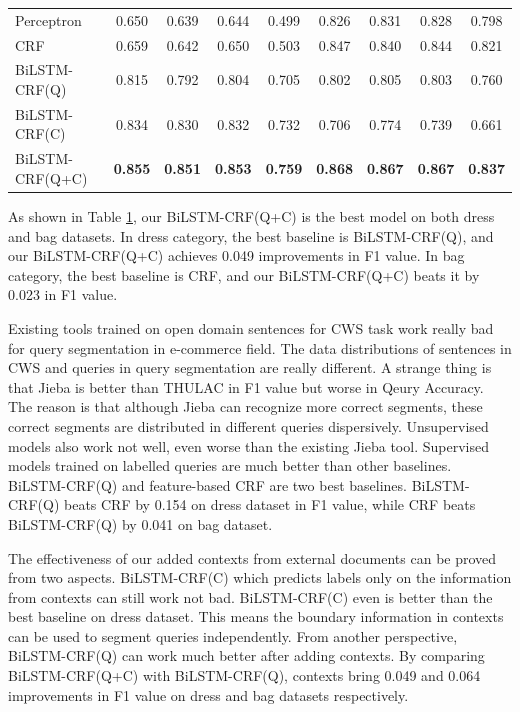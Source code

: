 \begin{table}[h!]
\begin{tabular}{lcccccccc}
		Perceptron              & 0.650                     & 0.639                   & 0.644          & 0.499          & 0.826          & 0.831          & 0.828          & 0.798          \\
		CRF                     & 0.659                     & 0.642                   & 0.650          & 0.503          & 0.847          & 0.840          & 0.844          & 0.821          \\
		BiLSTM-CRF(Q)           & 0.815                     & 0.792                   & 0.804          & 0.705          & 0.802          & 0.805          & 0.803          & 0.760          \\
		\midrule
		BiLSTM-CRF(C)           & 0.834                     & 0.830                   & 0.832          & 0.732          & 0.706          & 0.774          & 0.739          & 0.661          \\
		BiLSTM-CRF(Q+C)         & \textbf{0.855}            & \textbf{0.851}          & \textbf{0.853} & \textbf{0.759} & \textbf{0.868} & \textbf{0.867} & \textbf{0.867} & \textbf{0.837} \\
		\bottomrule
	\end{tabular}
	\label{tab:main}
\end{table}

As shown in Table \ref{tab:main}, our BiLSTM-CRF(Q+C) is the best model on both dress and bag datasets. In dress category, the best baseline is BiLSTM-CRF(Q), and our BiLSTM-CRF(Q+C) achieves 0.049 improvements in F1 value. In bag category, the best baseline is CRF, and our BiLSTM-CRF(Q+C) beats it by 0.023 in F1 value.

Existing tools trained on open domain sentences for CWS task work really bad for query segmentation in e-commerce field. The data distributions of sentences in CWS and queries in query segmentation are really different. A strange thing is that Jieba is better than THULAC in F1 value but worse in Qeury Accuracy. The reason is that although Jieba can recognize more correct segments, these correct segments are distributed in different queries dispersively. Unsupervised models also work not well, even worse than the existing Jieba tool. Supervised models trained on labelled queries are much better than other baselines. BiLSTM-CRF(Q) and feature-based CRF are two best baselines. BiLSTM-CRF(Q) beats CRF by 0.154 on dress dataset in F1 value, while CRF beats BiLSTM-CRF(Q) by 0.041 on bag dataset.

The effectiveness of our added contexts from external documents can be proved from two aspects. BiLSTM-CRF(C) which predicts labels only on the information from contexts can still work not bad. BiLSTM-CRF(C) even is better than the best baseline on dress dataset. This means the boundary information in contexts can be used to segment queries independently. From another perspective, BiLSTM-CRF(Q) can work much better after adding contexts. By comparing BiLSTM-CRF(Q+C) with BiLSTM-CRF(Q), contexts bring  0.049 and 0.064 improvements in F1 value on dress and bag datasets respectively.

